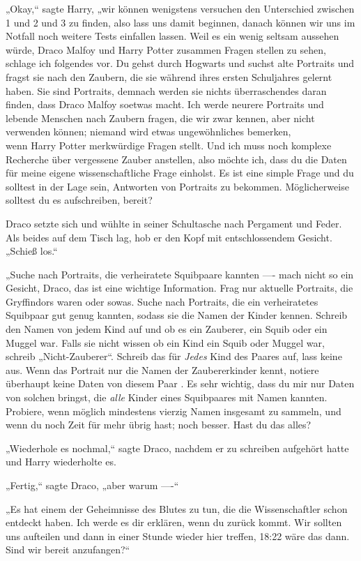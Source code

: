 {„Okay,“ sagte Harry, „wir können wenigstens versuchen den Unterschied zwischen 1 und 2 und 3 zu finden, also lass uns damit beginnen, danach können wir uns im Notfall noch weitere Tests einfallen lassen. Weil es ein wenig seltsam aussehen würde, Draco Malfoy und Harry Potter zusammen Fragen stellen zu sehen, schlage ich folgendes vor. Du gehst durch Hogwarts und suchst alte Portraits und fragst sie nach den Zaubern, die sie während ihres ersten Schuljahres gelernt haben. Sie sind Portraits, demnach werden sie nichts überraschendes daran finden, dass Draco Malfoy soetwas macht. Ich werde neurere Portraits und lebende Menschen nach Zaubern fragen, die wir zwar kennen, aber nicht verwenden können; niemand wird etwas ungewöhnliches bemerken,\\ wenn Harry Potter merkwürdige Fragen stellt. Und ich muss noch komplexe Recherche über vergessene Zauber anstellen, also möchte ich, dass du die Daten für meine eigene wissenschaftliche Frage einholst. Es ist eine simple Frage und du solltest in der Lage sein, Antworten von Portraits zu bekommen. Möglicherweise solltest du es aufschreiben, bereit?

Draco setzte sich und wühlte in seiner Schultasche nach Pergament und Feder. Als beides auf dem Tisch lag, hob er den Kopf mit entschlossendem Gesicht. „Schieß los.“

„Suche nach Portraits, die verheiratete Squibpaare kannten ---- mach nicht so ein Gesicht, Draco, das ist eine wichtige Information. Frag nur aktuelle Portraits, die Gryffindors waren oder sowas. Suche nach Portraits, die ein verheiratetes Squibpaar gut genug kannten, sodass sie die Namen der Kinder kennen. Schreib den Namen von jedem Kind auf und ob es ein Zauberer, ein Squib oder ein Muggel war. Falls sie nicht wissen ob ein Kind ein Squib oder Muggel war, schreib „Nicht-Zauberer“. Schreib das für \emph{Jedes} Kind des Paares auf, lass keine aus. Wenn das Portrait nur die Namen der Zaubererkinder kennt, notiere überhaupt keine Daten von diesem Paar . Es sehr wichtig, dass du mir nur Daten von solchen bringst, die \emph{alle} Kinder eines Squibpaares mit Namen kannten. Probiere, wenn möglich mindestens vierzig Namen insgesamt zu sammeln, und wenn du noch Zeit für mehr übrig hast; noch besser. Hast du das alles?

„Wiederhole es nochmal,“ sagte Draco, nachdem er zu schreiben aufgehört hatte und Harry wiederholte es.

„Fertig,“ sagte Draco, „aber warum ----“

„Es hat einem der Geheimnisse des Blutes zu tun, die die Wissenschaftler schon entdeckt haben. Ich werde es dir erklären, wenn du zurück kommt. Wir sollten uns aufteilen und dann in einer Stunde wieder hier treffen, 18:22 wäre das dann. Sind wir bereit anzufangen?“

}
